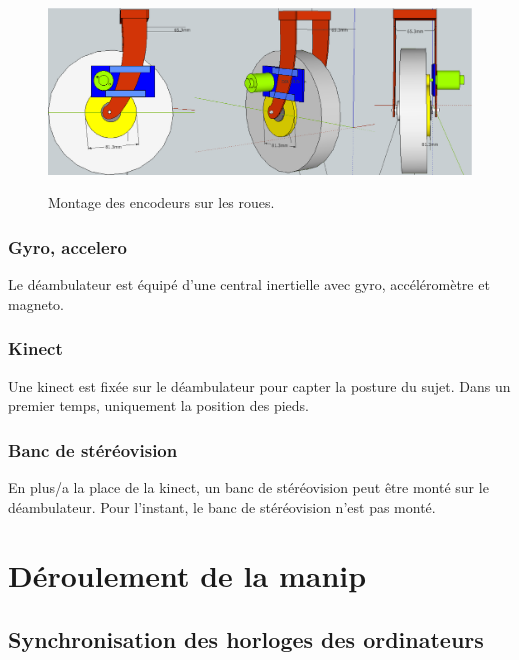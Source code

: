 \documentclass[a4paper, 10pt ]{article}
\begin{document}
\begin{figure}
\includegraphics[width=0.8\columnwidth]{images/encodeur.eps}
\label{fig:encodeur}
\caption{Montage des encodeurs sur les roues.}
\end{figure}

\subsubsection{Gyro, accelero}

Le déambulateur est équipé d'une central inertielle avec gyro, accéléromètre et magneto.

\subsubsection{Kinect}

Une kinect est fixée sur le déambulateur pour capter la posture du sujet. Dans un premier temps, uniquement la position des pieds.

\subsubsection{Banc de stéréovision}

En plus/a la place de la kinect, un banc de stéréovision peut être monté sur le déambulateur.
Pour l'instant, le banc de stéréovision n'est pas monté.

\section{Déroulement de la manip}

\subsection{Synchronisation des horloges des ordinateurs}
\end{document}
